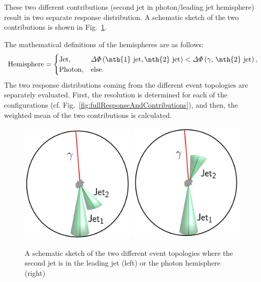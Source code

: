 These two different contributions (second jet in photon/leading jet hemisphere) result in two separate response distribution.
A schematic sketch of the two contributions is shown in Fig.~\ref{fig:sketch}. 



The mathematical definitions of the hemispheres are as follows:
\begin{equation}\label{eq:HemisphereDefinition}
\text{Hemisphere} = \begin{cases}
  \text{Jet},    & \Delta \Phi \left( \text{\nth{1} jet,\,\nth{2} jet} \right) < \Delta \Phi \left( \gamma \text{, \nth{2} jet} \right) , \\
  \text{Photon}, & \text{else}.\\
\end{cases}
\end{equation}
The two response distributions coming from the different event topologies are separately evaluated. First, the resolution is determined for each of the configurations 
(cf. Fig.~\ref{fig:fullResponseAndContributions}), and then, the weighted mean of the two contributions is calculated.
\begin{figure}[!t]
 \centering
     \includegraphics[width=0.49\textwidth]{figures/resolution/methodology/2ndJet_in_JetHemisphere.pdf}
     \includegraphics[width=0.49\textwidth]{figures/resolution/methodology/2ndJet_in_PhotonHemisphere.pdf}
  \caption{A schematic sketch of the two different event topologies where the second jet is in the leading jet (left) or the photon hemisphere (right)}  
 \label{fig:sketch}
\end{figure}
